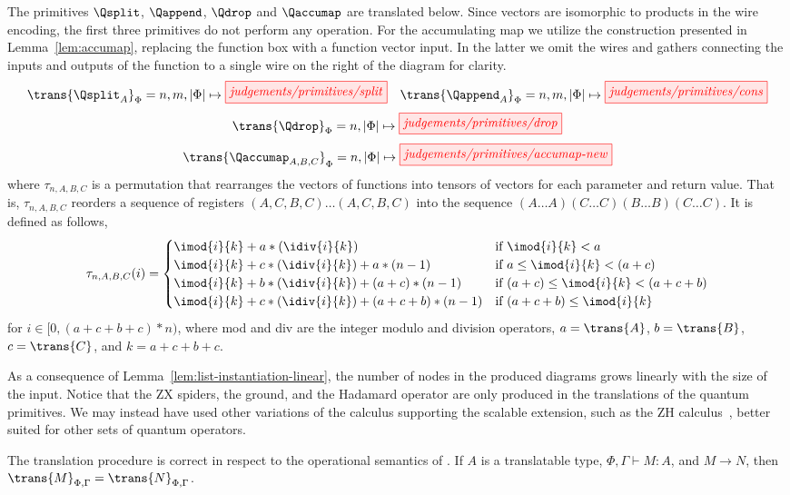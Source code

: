 The primitives $\Qsplit$, $\Qappend$, $\Qdrop$ and $\Qaccumap$ are translated below. 
Since vectors are isomorphic to products in the wire encoding,
the first three primitives do not perform any operation.
For the accumulating map we utilize the construction presented in Lemma~\ref{lem:accumap},
replacing the function box with a function vector input.
In the latter we omit the wires and gathers connecting the inputs and outputs of the function
to a single wire on the right of the diagram for clarity.
\[
    \trans{\Qsplit_A}_\Phi = n, m, |\Phi| \mapsto \tikzfig{judgements/primitives/split}
    \quad
    \trans{\Qappend_A}_\Phi = n, m, |\Phi| \mapsto \tikzfig{judgements/primitives/cons}
\]
\[
    \trans{\Qdrop}_\Phi = n,|\Phi| \mapsto \tikzfig{judgements/primitives/drop}
\]
\[
    \trans{\Qaccumap_{A,B,C}}_\Phi = n, |\Phi| \mapsto \tikzfig{judgements/primitives/accumap-new}
\]
where $\tau_{n,A,B,C}$ is a permutation that rearranges the vectors of functions into tensors of
vectors for each parameter and return value.
That is, $\tau_{n,A,B,C}$ reorders a sequence of registers $(A,C,B,C)\dots(A,C,B,C)$
into the sequence $(A\dots A)(C\dots C)(B\dots B)(C\dots C)$.
It is defined as follows,
\[
    \tau_{n,A,B,C}(i) = \begin{cases}
        \imod{i}{k} + a * (\idiv{i}{k}) & \text{if } \imod{i}{k} < a \\
        \imod{i}{k} + c * (\idiv{i}{k}) + a*(n-1) & \text{if } a \leq \imod{i}{k} < (a+c) \\
        \imod{i}{k} + b * (\idiv{i}{k}) + (a+c)*(n-1) & \text{if } (a+c) \leq \imod{i}{k} < (a+c+b) \\
        \imod{i}{k} + c * (\idiv{i}{k}) + (a+c+b)*(n-1) & \text{if } (a+c+b) \leq \imod{i}{k} \\
    \end{cases}
\]
for $i \in [0,(a+c+b+c)*n)$,
where mod and div are the integer modulo and division operators,
$a = \trans{A}$, $b = \trans{B}$, $c = \trans{C}$,
and $k = a+c+b+c$.

As a consequence of Lemma~\ref{lem:list-instantiation-linear},
the number of nodes in the produced diagrams grows linearly
with the size of the input.
Notice that the ZX spiders, the ground, and the Hadamard operator
are only produced in the translations of the quantum primitives.
We may instead have used other variations of the calculus
supporting the scalable extension, such as the ZH calculus~\cite{Backens_2019},
better suited for other sets of quantum operators.

\begin{lemma}%
    \label{lem:trans-reduction}
    The translation procedure is correct in respect to the operational semantics of \lambdaD.
    If $A$ is a translatable type, $\Phi, \Gamma \vdash M : A$, and $M \to N$,
    then $\trans{M}_{\Phi,\Gamma} = \trans{N}_{\Phi,\Gamma}$.
\end{lemma}